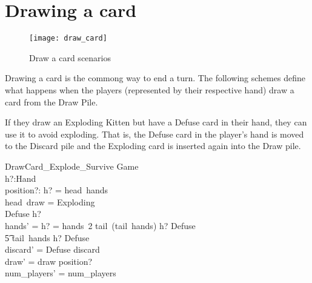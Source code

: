 \documentclass[11pt, fuzz]{article}
\begin{document}



\section{Drawing a card}

\begin{figure}
    \texttt{[image: draw\_card]}
    \caption{Draw a card scenarios}
\end{figure}

Drawing a card is the commong way to end a turn. The following schemes define what happens when the players (represented by their respective hand) draw a card from the Draw Pile. 

If they draw an Exploding Kitten but have a Defuse card in their hand, they can use it to avoid exploding. That is, the Defuse card in the player's hand is moved to the Discard pile and the Exploding card is inserted again into the Draw pile.

\begin{schema}{DrawCard\_Explode\_Survive}
    \Delta Game \\
    h?:Hand \\
    position?: \nat
\where
    h? = head~hands \\
    head~draw = Exploding \\
    Defuse \inbag h? \\
    hands' = \IF h? = hands~2 \THEN tail~(tail~hands) \cat \langle h? \uminus \lbag Defuse \rbag \rangle \\ \t5 \ELSE tail~hands \cat \langle h? \uminus \lbag Defuse \rbag \rangle\\
    discard' = \langle Defuse \rangle \cat discard \\
    draw' = draw \insertHead position? \\
    num\_players' = num\_players
\end{schema}
\end{document}
